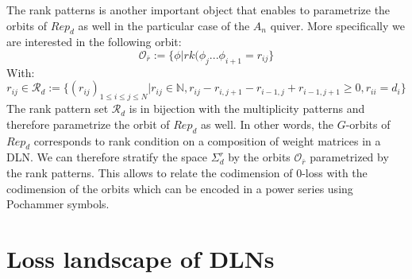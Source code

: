 \documentclass{article}
\theoremstyle{definition}
\begin{document}
The rank patterns is another important object that enables to parametrize the orbits of $Rep_d$ as well in the particular case of the $A_n$ quiver. More specifically we are interested in the following orbit:
\begin{equation*}
    \mathcal{O}_{\bar{r}}:=\{\phi|rk(\phi_j...\phi_{i+1}= r_{ij}\}
\end{equation*}
With:
\begin{equation*}
    r_{ij}\in\mathcal{R}_d:=\{(r_{ij})_{1\leq i \leq j \leq N}|r_{ij} \in\mathbb{N}, r_{ij} - r_{i,j+1} - r_{i-1,j} + r_{i-1,j+1} \geq 0, r_{ii} = d_i\}
\end{equation*}
The rank pattern set $\mathcal{R}_d$ is in bijection with the multiplicity patterns and therefore parametrize the orbit of $Rep_d$ as well. In other words, the $G$-orbits of $Rep_d$ corresponds to rank condition on a composition of weight matrices in a DLN. We can therefore stratify the space $\Sigma_d^r$ by the orbits $\mathcal{O}_{\bar{r}}$ parametrized by the rank patterns. This allows to relate the codimension of 0-loss with the codimension of the orbits which can be encoded in a power series using Pochammer symbols.
\section{Loss landscape of DLNs}
\end{document}
